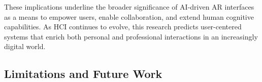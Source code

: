 \begin{itemize}
\end{itemize}

These implications underline the broader significance of AI-driven AR interfaces as a means to empower users, enable collaboration, and extend human cognitive capabilities.
As HCI continues to evolve, this research predicts user-centered systems that enrich both personal and professional interactions in an increasingly digital world.

\subsection{Limitations and Future Work}

